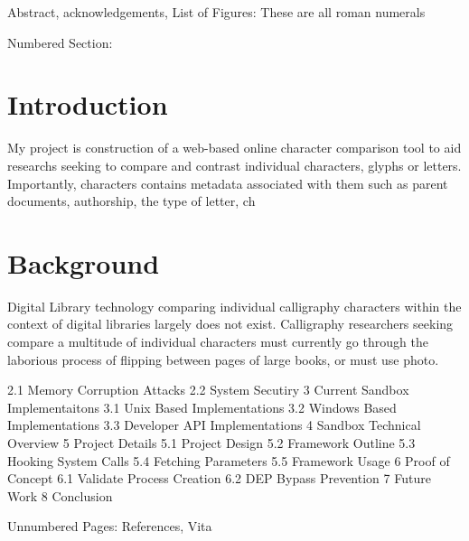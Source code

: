 Abstract, acknowledgements, List of Figures:  These are all roman numerals

Numbered Section:

\section{Introduction}

My project is construction of a web-based online character comparison tool to aid researchs seeking to compare and contrast individual characters, glyphs or letters.  Importantly, characters contains metadata associated with them such as parent documents, authorship, the type of letter, ch




\section{Background}

Digital Library technology comparing individual calligraphy characters within the context of digital libraries largely does not exist.  Calligraphy researchers seeking compare a multitude of individual characters must currently go through the laborious process of flipping between pages of large books, or must use photo.



2.1     Memory Corruption Attacks
2.2     System Secutiry
3       Current Sandbox Implementaitons
3.1     Unix Based Implementations
3.2     Windows Based Implementations
3.3     Developer API Implementations
4       Sandbox Technical Overview
5       Project Details
5.1     Project Design
5.2     Framework Outline
5.3     Hooking System Calls
5.4     Fetching Parameters
5.5     Framework Usage
6       Proof of Concept
6.1     Validate Process Creation
6.2     DEP Bypass Prevention
7       Future Work
8       Conclusion

Unnumbered Pages: References, Vita

